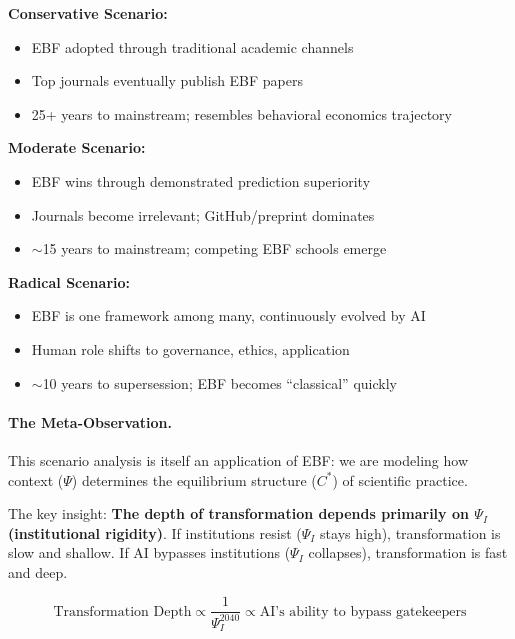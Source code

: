 \begin{tcolorbox}[colback=orange!5!white, colframe=orange!75!black,
    title=\textbf{Scenario-Dependent EBF Trajectories}]

\textbf{Conservative Scenario:}
\begin{itemize}[nosep]
    \item EBF adopted through traditional academic channels
    \item Top journals eventually publish EBF papers
    \item 25+ years to mainstream; resembles behavioral economics trajectory
\end{itemize}

\textbf{Moderate Scenario:}
\begin{itemize}[nosep]
    \item EBF wins through demonstrated prediction superiority
    \item Journals become irrelevant; GitHub/preprint dominates
    \item $\sim$15 years to mainstream; competing EBF schools emerge
\end{itemize}

\textbf{Radical Scenario:}
\begin{itemize}[nosep]
    \item EBF is one framework among many, continuously evolved by AI
    \item Human role shifts to governance, ethics, application
    \item $\sim$10 years to supersession; EBF becomes ``classical'' quickly
\end{itemize}

\end{tcolorbox}

\paragraph{The Meta-Observation.}

This scenario analysis is itself an application of EBF: we are modeling how context
($\Psi$) determines the equilibrium structure ($C^*$) of scientific practice.

The key insight: \textbf{The depth of transformation depends primarily on $\Psi_I$
(institutional rigidity)}. If institutions resist ($\Psi_I$ stays high), transformation
is slow and shallow. If AI bypasses institutions ($\Psi_I$ collapses), transformation
is fast and deep.

\begin{equation}
\text{Transformation Depth} \propto \frac{1}{\Psi_I^{2040}} \propto \text{AI's ability to bypass gatekeepers}
\end{equation}

